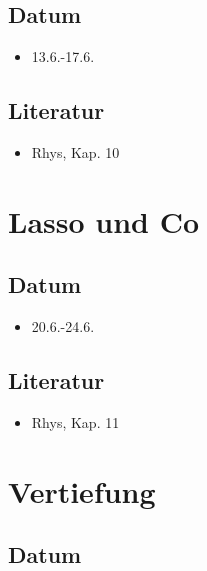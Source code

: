 \documentclass[
]{book}
\providecommand{\tightlist}{%
  \setlength{\itemsep}{0pt}\setlength{\parskip}{0pt}}
\begin{document}
\hypertarget{datum-12}{%
\subsection{Datum}\label{datum-12}}

\begin{itemize}
\tightlist
\item
  13.6.-17.6.
\end{itemize}

\hypertarget{literatur-11}{%
\subsection{Literatur}\label{literatur-11}}

\begin{itemize}
\tightlist
\item
  Rhys, Kap. 10
\end{itemize}

\hypertarget{lasso-und-co}{%
\section{Lasso und Co}\label{lasso-und-co}}

\hypertarget{datum-13}{%
\subsection{Datum}\label{datum-13}}

\begin{itemize}
\tightlist
\item
  20.6.-24.6.
\end{itemize}

\hypertarget{literatur-12}{%
\subsection{Literatur}\label{literatur-12}}

\begin{itemize}
\tightlist
\item
  Rhys, Kap. 11
\end{itemize}

\hypertarget{vertiefung-2}{%
\section{Vertiefung}\label{vertiefung-2}}

\hypertarget{datum-14}{%
\subsection{Datum}\label{datum-14}}
\end{document}
